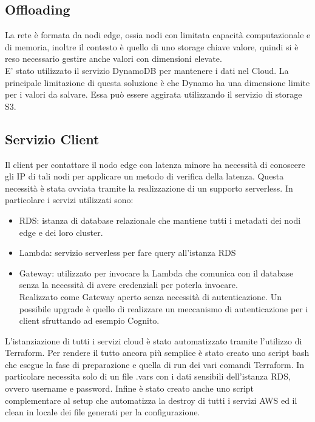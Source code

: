 \documentclass[conference]{IEEEtran}
\begin{document}
\subsection{Offloading}
La rete è formata da nodi edge, ossia nodi con limitata capacità computazionale e di memoria, inoltre il contesto
è quello di uno storage chiave valore, quindi si è reso necessario gestire anche valori con dimensioni elevate.\\
E' stato utilizzato il servizio DynamoDB per mantenere i dati nel Cloud.
La principale limitazione di questa soluzione è che Dynamo ha una dimensione limite per i valori da salvare.
Essa può essere aggirata utilizzando il servizio di storage S3.

\subsection{Servizio Client}
Il client per contattare il nodo edge con latenza minore ha necessità di conoscere gli IP di tali nodi per applicare un
metodo di verifica della latenza. Questa necessità è stata ovviata tramite la realizzazione di un supporto serverless.
In particolare i servizi utilizzati sono:
\begin{itemize}
  \item {RDS: }istanza di database relazionale che mantiene tutti i metadati dei nodi edge e dei loro cluster.
  \item {Lambda: }servizio serverless per fare query all'istanza RDS
  \item {Gateway: }utilizzato per invocare la Lambda che comunica con il database senza la necessità di avere credenziali
                  per poterla invocare.\\
                  Realizzato come Gateway aperto senza necessità di autenticazione.
                  Un possibile upgrade è quello di realizzare un meccanismo di autenticazione per i client sfruttando
                  ad esempio Cognito.
\end{itemize}
L'istanziazione di tutti i servizi cloud è stato automatizzato tramite l'utilizzo di Terraform.
Per rendere il tutto ancora più semplice è stato creato uno script bash che esegue la fase di preparazione e quella di run dei vari comandi Terraform.
In particolare necessita solo di un file .vars con i dati sensibili dell'istanza RDS, ovvero username e password.
Infine è stato creato anche uno script complementare al setup che automatizza la destroy di tutti i servizi AWS ed il clean in locale dei file
generati per la configurazione.
\end{document}
